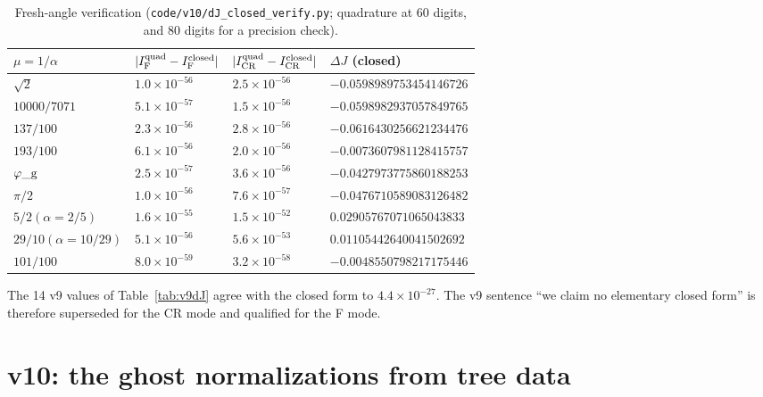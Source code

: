 \documentclass[11pt,a4paper]{article}
\newcommand{\loc}[1]{\nolinkurl{#1}}
\theoremstyle{plain}
\theoremstyle{definition}
\theoremstyle{remark}
\numberwithin{equation}{section}
\begin{document}
\begin{center}\scriptsize
\begin{longtable}{@{}llll@{}}
\caption{Fresh-angle verification (\loc{code/v10/dJ_closed_verify.py}; quadrature at 60 digits, and 80 digits for a precision check).}\label{tab:v10dJ}\\
\toprule
\(\mu=1/\alpha\) & \(|I_{\rm F}^{\rm quad}-I_{\rm F}^{\rm closed}|\) & \(|I_{\rm CR}^{\rm quad}-I_{\rm CR}^{\rm closed}|\) & \(\Delta J\) (closed)\\
\midrule
\(\sqrt2\) & \(1.0\times10^{-56}\) & \(2.5\times10^{-56}\) & \(-0.0598989753454146726\)\\
\(10000/7071\) & \(5.1\times10^{-57}\) & \(1.5\times10^{-56}\) & \(-0.0598982937057849765\)\\
\(137/100\) & \(2.3\times10^{-56}\) & \(2.8\times10^{-56}\) & \(-0.0616430256621234476\)\\
\(193/100\) & \(6.1\times10^{-56}\) & \(2.0\times10^{-56}\) & \(-0.0073607981128415757\)\\
\(\varphi\_{\rm g}\) & \(2.5\times10^{-57}\) & \(3.6\times10^{-56}\) & \(-0.0427973775860188253\)\\
\(\pi/2\) & \(1.0\times10^{-56}\) & \(7.6\times10^{-57}\) & \(-0.0476710589083126482\)\\
\(5/2 (\alpha=2/5)\) & \(1.6\times10^{-55}\) & \(1.5\times10^{-52}\) & \(0.02905767071065043833\)\\
\(29/10 (\alpha=10/29)\) & \(5.1\times10^{-56}\) & \(5.6\times10^{-53}\) & \(0.01105442640041502692\)\\
\(101/100\) & \(8.0\times10^{-59}\) & \(3.2\times10^{-58}\) & \(-0.0048550798217175446\)\\
\bottomrule
\end{longtable}
\end{center}
The 14 v9 values of Table~\ref{tab:v9dJ} agree with the closed form
to \(4.4\times10^{-27}\). The v9 sentence ``we claim no elementary
closed form'' is therefore superseded for the CR mode and qualified
for the F mode.

\section{v10: the ghost normalizations from tree data}
\label{sec:v10lambda}
\end{document}
